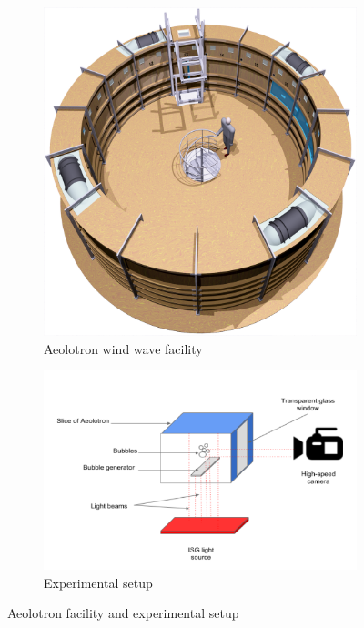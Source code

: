 		\begin{figure}
			\centering
			\begin{subfigure}[t]{.4\linewidth}
				\centering
				\includegraphics[scale=0.1]{images/aeolotron-gesamt.png}
				\caption{Aeolotron wind wave facility}
			\end{subfigure}
			\begin{subfigure}[t]{.4\linewidth}		
				\centering
				\includegraphics[scale=.8]{images/aeolotron_setup.png}
				\caption{Experimental setup}
			\end{subfigure}
			
			\caption{Aeolotron facility and experimental setup}
			\label{fig:aeolotron_setup}
		\end{figure}
	
